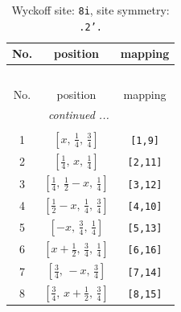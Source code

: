 \documentclass[fleqn,8pt]{jsarticle}
\begin{document}
\renewcommand{\arraystretch}{1.2}
\begin{longtable}{ccc}
\caption{Wyckoff site: {\tt 8i}, site symmetry: {\tt .2'.}}
 \\
 \hline \hline
No. & position & mapping \\ \hline \endfirsthead

\multicolumn{2}{l}{\tablename\ \thetable{}} \\
 \hline \hline
No. & position & mapping \\ \hline \endhead

 \hline \hline
\multicolumn{2}{r}{\footnotesize\it continued ...} \\ \endfoot

 \hline \hline
\multicolumn{2}{r}{} \\ \endlastfoot

1 & $\left[ x,\, \frac{1}{4},\, \frac{3}{4} \right]$ & {\tt [1,9]} \\ \hline
2 & $\left[ \frac{1}{4},\, x,\, \frac{1}{4} \right]$ & {\tt [2,11]} \\ \hline
3 & $\left[ \frac{1}{4},\, \frac{1}{2} - x,\, \frac{1}{4} \right]$ & {\tt [3,12]} \\ \hline
4 & $\left[ \frac{1}{2} - x,\, \frac{1}{4},\, \frac{3}{4} \right]$ & {\tt [4,10]} \\ \hline
5 & $\left[ - x,\, \frac{3}{4},\, \frac{1}{4} \right]$ & {\tt [5,13]} \\ \hline
6 & $\left[ x + \frac{1}{2},\, \frac{3}{4},\, \frac{1}{4} \right]$ & {\tt [6,16]} \\ \hline
7 & $\left[ \frac{3}{4},\, - x,\, \frac{3}{4} \right]$ & {\tt [7,14]} \\ \hline
8 & $\left[ \frac{3}{4},\, x + \frac{1}{2},\, \frac{3}{4} \right]$ & {\tt [8,15]} \\
\end{longtable}
\renewcommand{\arraystretch}{1.2}
\end{document}
